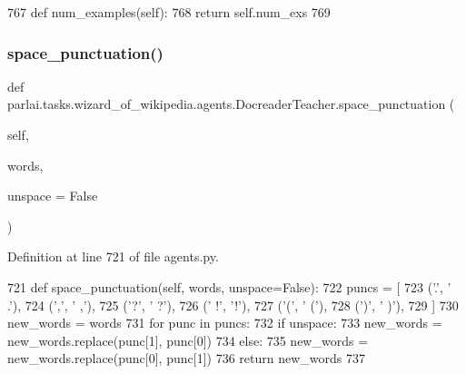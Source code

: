 \begin{DoxyCode}
767     \textcolor{keyword}{def }num\_examples(self):
768         \textcolor{keywordflow}{return} self.num\_exs
769 
\end{DoxyCode}
\mbox{\label{classparlai_1_1tasks_1_1wizard__of__wikipedia_1_1agents_1_1DocreaderTeacher_a42fbde07e6112b1b284ef8e89283a948}} 
\subsubsection{\texorpdfstring{space\+\_\+punctuation()}{space\_punctuation()}}
{\footnotesize\ttfamily def parlai.\+tasks.\+wizard\+\_\+of\+\_\+wikipedia.\+agents.\+Docreader\+Teacher.\+space\+\_\+punctuation (\begin{DoxyParamCaption}\item[{}]{self,  }\item[{}]{words,  }\item[{}]{unspace = {\ttfamily False} }\end{DoxyParamCaption})}



Definition at line 721 of file agents.\+py.


\begin{DoxyCode}
721     \textcolor{keyword}{def }space\_punctuation(self, words, unspace=False):
722         puncs = [
723             (\textcolor{stringliteral}{'.'}, \textcolor{stringliteral}{' .'}),
724             (\textcolor{stringliteral}{','}, \textcolor{stringliteral}{' ,'}),
725             (\textcolor{stringliteral}{'?'}, \textcolor{stringliteral}{' ?'}),
726             (\textcolor{stringliteral}{' !'}, \textcolor{stringliteral}{'!'}),
727             (\textcolor{stringliteral}{'('}, \textcolor{stringliteral}{' ('}),
728             (\textcolor{stringliteral}{')'}, \textcolor{stringliteral}{' )'}),
729         ]
730         new\_words = words
731         \textcolor{keywordflow}{for} punc \textcolor{keywordflow}{in} puncs:
732             \textcolor{keywordflow}{if} unspace:
733                 new\_words = new\_words.replace(punc[1], punc[0])
734             \textcolor{keywordflow}{else}:
735                 new\_words = new\_words.replace(punc[0], punc[1])
736         \textcolor{keywordflow}{return} new\_words
737 
\end{DoxyCode}


